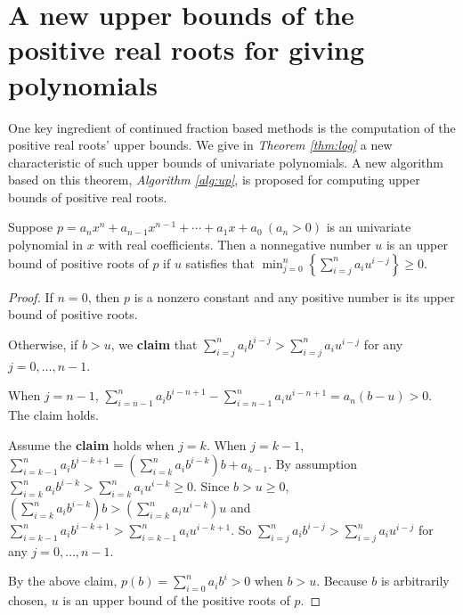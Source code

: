 
\section{A new upper bounds of the positive real roots for giving  polynomials}
\label{sec:thm}

One key ingredient of continued fraction based methods is the computation of  the positive real roots' upper bounds. We give in {\em Theorem \ref{thm:log}} a new characteristic of such upper bounds of univariate polynomials. A new algorithm based on this theorem, {\em Algorithm \ref{alg:up}}, is proposed for computing upper bounds of positive real roots.


\begin{theorem} 
	\label{thm:log}
  Suppose   $p=a_nx^n+a_{n-1}x^{n-1}+\cdots+a_1x+a_0\ (a_n>0)$  is an univariate polynomial in $x$ with real coefficients.  Then  a nonnegative number $u$ is an upper bound of positive roots of $p$ if $u$   satisfies that $\min_{j=0}^{n}\left\{  \sum_{i=j}^n a_i u^{i-j}\right\}\ge0$.
\end{theorem}
\begin{proof}
  If $n=0$, then $p$ is a nonzero constant and any positive number is its upper bound of positive roots.

  Otherwise, if $b>u$,  we {\bf claim} that $\sum_{i=j}^na_ib^{i-j}> \sum_{i=j}^na_iu^{i-j}$ for any $j= 0,\ldots,n-1$.

  When $j=n-1$, $\sum_{i=n-1}^na_ib^{i-n+1}-\sum_{i=n-1}^na_iu^{i-n+1}=a_n(b-u)>0.$ The claim holds.

  Assume the {\bf claim} holds  when $j=k$. When $j=k-1$,  $\sum_{i=k-1}^na_ib^{i-k+1}=\left(\sum_{i=k}^na_ib^{i-k}\right)b+a_{k-1} $. By assumption
  $\sum_{i=k}^na_ib^{i-k}>\sum_{i=k}^na_iu^{i-k}\ge0$. Since $b>u\ge0$, $\left(\sum_{i=k}^na_ib^{i-k}\right)b>\left (\sum_{i=k}^na_iu^{i-k} \right)u  $
  and $\sum_{i=k-1}^na_ib^{i-k+1}> \sum_{i=k-1}^na_iu^{i-k+1}$. So  $\sum_{i=j}^na_ib^{i-j}> \sum_{i=j}^na_iu^{i-j}$ for any $j= 0,\ldots,n-1$.


  By the above claim,   $p(b)=\sum_{i=0}^na_ib^i>0$ when  $b>u$. Because $b$ is arbitrarily chosen, $u$ is an upper bound of the positive roots of $p$.

\end{proof}

